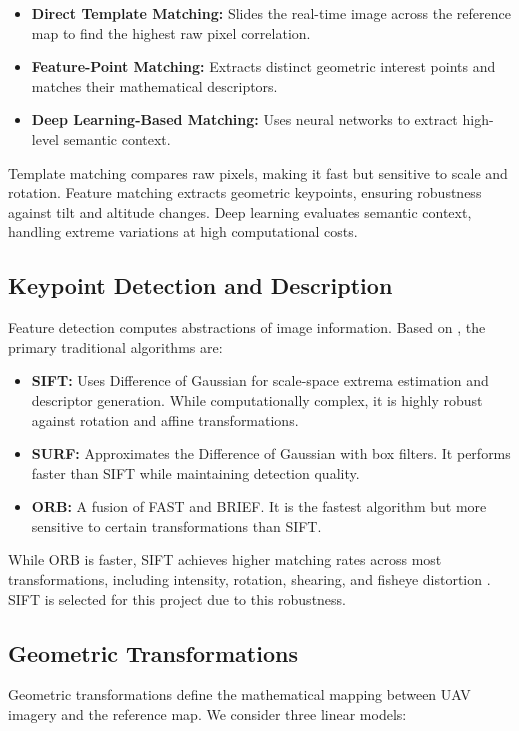 \documentclass[conference]{IEEEtran}
\begin{document}
\begin{itemize}
    \item \textbf{Direct Template Matching:} Slides the real-time image across the reference map to find the highest raw pixel correlation.
    \item \textbf{Feature-Point Matching:} Extracts distinct geometric interest points and matches their mathematical descriptors.
    \item \textbf{Deep Learning-Based Matching:} Uses neural networks to extract high-level semantic context.
\end{itemize}

Template matching compares raw pixels, making it fast but sensitive to scale and rotation. Feature matching extracts geometric keypoints, ensuring robustness against tilt and altitude changes. Deep learning evaluates semantic context, handling extreme variations at high computational costs.

\subsection{Keypoint Detection and Description}
Feature detection computes abstractions of image information. Based on \cite{b2}, the primary traditional algorithms are:

\begin{itemize}
    \item \textbf{SIFT:} Uses Difference of Gaussian for scale-space extrema estimation and descriptor generation. While computationally complex, it is highly robust against rotation and affine transformations.
    \item \textbf{SURF:} Approximates the Difference of Gaussian with box filters. It performs faster than SIFT while maintaining detection quality.
    \item \textbf{ORB:} A fusion of FAST and BRIEF. It is the fastest algorithm but more sensitive to certain transformations than SIFT.
\end{itemize}

While ORB is faster, SIFT achieves higher matching rates across most transformations, including intensity, rotation, shearing, and fisheye distortion \cite{b2}. SIFT is selected for this project due to this robustness.

\subsection{Geometric Transformations}
Geometric transformations define the mathematical mapping between UAV imagery and the reference map. We consider three linear models:
\end{document}
